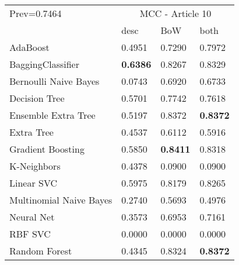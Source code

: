 \begin{tabular}{|l|l|l|l| }
\hline
Prev=0.7464 &  \multicolumn{3}{c|}{MCC - Article 10} \\
\cline{2-4} & desc & BoW & both \\ \hline
AdaBoost                & 0.4951 & 0.7290 & 0.7972\\
BaggingClassifier       & {\bf 0.6386} & 0.8267 & 0.8329\\
Bernoulli Naive Bayes   & 0.0743 & 0.6920 & 0.6733\\
Decision Tree           & 0.5701 & 0.7742 & 0.7618\\
Ensemble Extra Tree     & 0.5197 & 0.8372 & {\bf 0.8372}\\
Extra Tree              & 0.4537 & 0.6112 & 0.5916\\
Gradient Boosting       & 0.5850 & {\bf 0.8411} & 0.8318\\
K-Neighbors             & 0.4378 & 0.0900 & 0.0900\\
Linear SVC              & 0.5975 & 0.8179 & 0.8265\\
Multinomial Naive Bayes & 0.2740 & 0.5693 & 0.4976\\
Neural Net              & 0.3573 & 0.6953 & 0.7161\\
RBF SVC                 & 0.0000 & 0.0000 & 0.0000\\
Random Forest           & 0.4345 & 0.8324 & {\bf 0.8372}\\
\hline
\end{tabular}